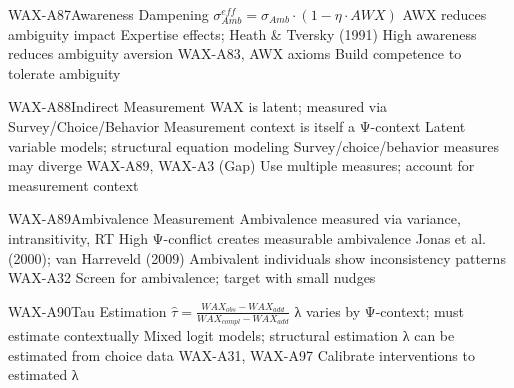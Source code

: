 \begin{axiomspec}{WAX-A87}{Awareness Dampening}
 $\sigma_{Amb}^{eff} = \sigma_{Amb} \cdot (1 - \eta \cdot AWX)$
 AWX reduces ambiguity impact
 Expertise effects; Heath \& Tversky (1991)
 High awareness reduces ambiguity aversion
 WAX-A83, AWX axioms
 Build competence to tolerate ambiguity
\end{axiomspec}


\begin{axiomspec}{WAX-A88}{Indirect Measurement}
 WAX is latent; measured via Survey/Choice/Behavior
 Measurement context is itself a Ψ-context
 Latent variable models; structural equation modeling
 Survey/choice/behavior measures may diverge
 WAX-A89, WAX-A3 (Gap)
 Use multiple measures; account for measurement context
\end{axiomspec}

\begin{axiomspec}{WAX-A89}{Ambivalence Measurement}
 Ambivalence measured via variance, intransitivity, RT
 High Ψ-conflict creates measurable ambivalence
 Jonas et al. (2000); van Harreveld (2009)
 Ambivalent individuals show inconsistency patterns
 WAX-A32
 Screen for ambivalence; target with small nudges
\end{axiomspec}

\begin{axiomspec}{WAX-A90}{Tau Estimation}
 $\hat{\tau} = \frac{WAX_{obs} - WAX_{add}}{WAX_{compl} - WAX_{add}}$
 λ varies by Ψ-context; must estimate contextually
 Mixed logit models; structural estimation
 λ can be estimated from choice data
 WAX-A31, WAX-A97
 Calibrate interventions to estimated λ
\end{axiomspec}


